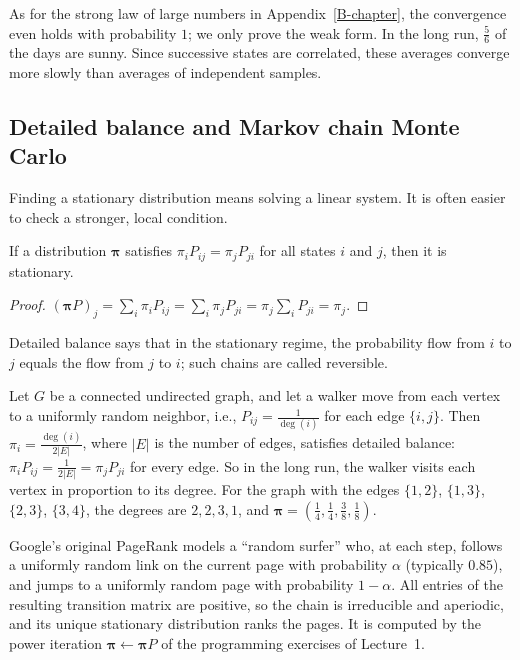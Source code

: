 As for the strong law of large numbers in Appendix~\ref{B-chapter}, the convergence even holds with probability $1$; we only prove the weak form. In the long run, $\frac{5}{6}$ of the days are sunny. Since successive states are correlated, these averages converge more slowly than averages of independent samples.

\subsection{Detailed balance and Markov chain Monte Carlo}

Finding a stationary distribution means solving a linear system. It is often easier to check a stronger, local condition.

\begin{proposition}\label{L4-prop:detailed-balance}
    If a distribution $\boldsymbol{\pi}$ satisfies $\pi_i P_{ij} = \pi_j P_{ji}$ for all states $i$ and $j$, then it is stationary.
\end{proposition}

\begin{proof}
    $(\boldsymbol{\pi}P)_j = \sum_i \pi_i P_{ij} = \sum_i \pi_j P_{ji} = \pi_j\sum_i P_{ji} = \pi_j$.
\end{proof}

Detailed balance says that in the stationary regime, the probability flow from $i$ to $j$ equals the flow from $j$ to $i$; such chains are called reversible.

\begin{example}\label{L4-ex:random-walk-graph}
    Let $G$ be a connected undirected graph, and let a walker move from each vertex to a uniformly random neighbor, i.e., $P_{ij} = \frac{1}{\deg(i)}$ for each edge $\{i, j\}$. Then $\pi_i = \frac{\deg(i)}{2|E|}$, where $|E|$ is the number of edges, satisfies detailed balance: $\pi_i P_{ij} = \frac{1}{2|E|} = \pi_j P_{ji}$ for every edge. So in the long run, the walker visits each vertex in proportion to its degree. For the graph with the edges $\{1, 2\}$, $\{1, 3\}$, $\{2, 3\}$, $\{3, 4\}$, the degrees are $2, 2, 3, 1$, and $\boldsymbol{\pi} = (\frac{1}{4}, \frac{1}{4}, \frac{3}{8}, \frac{1}{8})$.
\end{example}

\begin{remark}[PageRank]
    Google's original PageRank models a ``random surfer'' who, at each step, follows a uniformly random link on the current page with probability $\alpha$ (typically $0.85$), and jumps to a uniformly random page with probability $1 - \alpha$. All entries of the resulting transition matrix are positive, so the chain is irreducible and aperiodic, and its unique stationary distribution ranks the pages. It is computed by the power iteration $\boldsymbol{\pi} \leftarrow \boldsymbol{\pi}P$ of the programming exercises of Lecture~1.
\end{remark}

